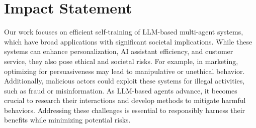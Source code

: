 \section{Impact Statement}
Our work focuses on efficient self-training of LLM-based multi-agent systems, which have broad applications with significant societal implications. While these systems can enhance personalization, AI assistant efficiency, and customer service, they also pose ethical and societal risks. For example, in marketing, optimizing for persuasiveness may lead to manipulative or unethical behavior. Additionally, malicious actors could exploit these systems for illegal activities, such as fraud or misinformation. As LLM-based agents advance, it becomes crucial to research their interactions and develop methods to mitigate harmful behaviors. Addressing these challenges is essential to responsibly harness their benefits while minimizing potential risks.